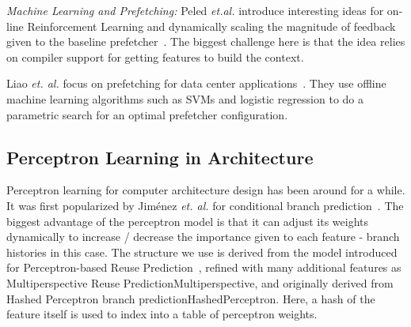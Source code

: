 \textit{Machine Learning and Prefetching:} Peled \textit{et.al.} introduce
interesting ideas for on-line Reinforcement Learning and dynamically scaling
the magnitude of feedback given to the baseline prefetcher~\cite{Semantics}.
The biggest challenge here is that the idea relies on compiler support for
getting features to build the context.

Liao \textit{et. al.} focus on prefetching for data center
applications~\cite{Datacenter}. They use offline machine learning algorithms
such as SVMs and logistic regression to do a parametric search for an optimal
prefetcher configuration.



\subsection{Perceptron Learning in Architecture}
\label{Background-Perceptron}
Perceptron learning for computer architecture design has been around for a
while.  It was first popularized by Jim\'enez \textit{et. al.} for conditional
branch prediction~\cite{Perc_Branch}. The biggest advantage of the perceptron
model is that it can adjust its weights dynamically to increase / decrease the
importance given to each feature - branch histories in this case.  The
structure we use is derived from the model introduced for Perceptron-based
Reuse Prediction~\cite{Perc_Reuse}, refined with many additional features as
Multiperspective Reuse Prediction{Multiperspective}, and originally derived
from Hashed Perceptron branch prediction{HashedPerceptron}.  Here, a hash of
the feature itself is used to index into a table of perceptron weights.

